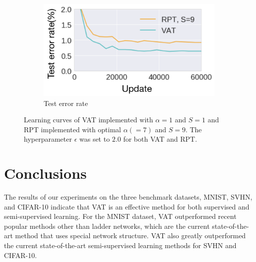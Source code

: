 \documentclass[10pt,journal,compsoc]{IEEEtran}
\begin{document}
\begin{figure}[ht]
	\centering
    \begin{subfigure}{0.3\textwidth}
	\includegraphics[width=\textwidth]{mnist/vat_vs_rp.pdf}
    \caption{Test error rate}
    \end{subfigure}
    
    \caption{\label{fig:vat_vs_rp}Learning curves of VAT implemented with $\alpha = 1$ and $S=1$ and RPT implemented with optimal $\alpha(=7)$ and $S = 9$.
The hyperparameter $\epsilon$ was set to $2.0$ for both VAT and RPT. 
    }
\end{figure}

\section{Conclusions}
The results of our experiments on the three benchmark datasets,  MNIST, SVHN, and CIFAR-10 indicate that VAT is an effective method for both supervised and semi-supervised learning. For the MNIST dataset, VAT outperformed recent popular methods other than ladder networks, which are the current state-of-the-art method that uses special network structure. VAT also greatly outperformed the current state-of-the-art semi-supervised learning methods for SVHN and CIFAR-10.  
\end{document}
